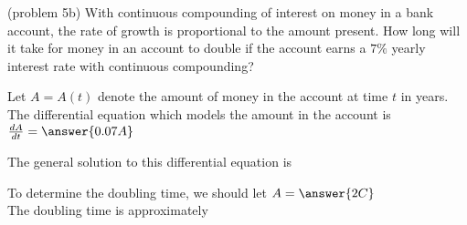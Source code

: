 \documentclass{ximera}
\begin{document}
\begin{problem}(problem 5b)
With continuous compounding of interest on money in a bank account, the rate of growth is proportional to the amount present.
How long will it take for money in an account to double if the account earns a $7\%$ yearly interest rate with continuous compounding?



Let $A= A(t)$ denote the amount of money in the account at time  $t$  in years.\\
The differential equation which models the amount in the account is\\

$\frac{dA}{dt} = \answer{0.07A}$

The general solution to this differential equation is 

\begin{multipleChoice}
\end{multipleChoice}

To determine the doubling time, we should let $A = \answer{2C}$\\

The doubling time is approximately

\begin{multipleChoice}
\end{multipleChoice}

\end{problem}
\end{document}
